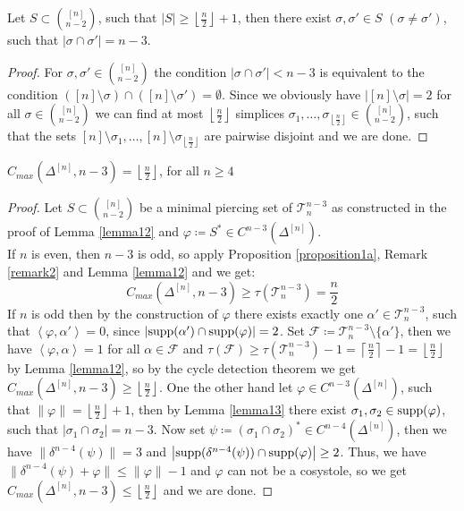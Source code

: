 \begin{lem}\label{lemma13}
Let \(S\subset\binom{[n]}{n-2}\), such that \(\left|S\right|\geq\left\lfloor\frac{n}{2}\right\rfloor+1\), then there exist \(\sigma,\sigma'\in S\) \((\sigma\neq\sigma')\), such that \(\left|\sigma\cap\sigma'\right|=n-3\).
\begin{proof}
For \(\sigma,\sigma'\in\binom{[n]}{n-2}\) the condition \(\left|\sigma\cap\sigma'\right|<n-3\) is equivalent to the condition \(([n]\setminus\sigma)\cap([n]\setminus\sigma')=\emptyset\). Since we obviously have \(\left|[n]\setminus\sigma\right|=2\) for all \(\sigma\in\binom{[n]}{n-2}\) we can find at most \(\left\lfloor\frac{n}{2}\right\rfloor\) simplices \(\sigma_1,\ldots,\sigma_{\left\lfloor\frac{n}{2}\right\rfloor}\in\binom{[n]}{n-2}\), such that the sets \([n]\setminus\sigma_1,\ldots,[n]\setminus\sigma_{\left\lfloor\frac{n}{2}\right\rfloor}\) are pairwise disjoint and we are done.
\end{proof}
\end{lem}

\begin{thm}
\(C_{max}(\Delta^{[n]},n-3)=\left\lfloor\frac{n}{2}\right\rfloor\), for all \(n\geq 4\)
\begin{proof}
Let \(S\subset\binom{[n]}{n-2}\) be a minimal piercing set of \(\mathcal{T}_n^{n-3}\) as constructed in the proof of Lemma \ref{lemma12} and \(\varphi\coloneqq S^*\in C^{n-3}(\Delta^{[n]})\).\\
If \(n\) is even, then \(n-3\) is odd, so apply Proposition \ref{proposition1a}, Remark \ref{remark2} and Lemma \ref{lemma12} and we get:
\[
C_{max}(\Delta^{[n]},n-3)\geq\tau(\mathcal{T}_n^{n-3})=\frac{n}{2}
\]
If \(n\) is odd then by the construction of \(\varphi\) there exists exactly one \(\alpha'\in\mathcal{T}_n^{n-3}\), such that \(\left\langle\varphi,\alpha'\right\rangle=0\), since \(\left|\mathrm{supp}(\alpha')\cap \mathrm{supp}(\varphi)\right|=2\). Set \(\mathcal{F}\coloneqq \mathcal{T}_n^{n-3}\setminus\{\alpha'\}\), then we have \(\left\langle\varphi,\alpha\right\rangle=1\) for all \(\alpha\in\mathcal{F}\) and \(\tau(\mathcal{F})\geq\tau(\mathcal{T}_n^{n-3})-1=\left\lceil\frac{n}{2}\right\rceil-1=\left\lfloor\frac{n}{2}\right\rfloor\) by Lemma \ref{lemma12}, so by the cycle detection theorem we get \(C_{max}(\Delta^{[n]},n-3)\geq\left\lfloor\frac{n}{2}\right\rfloor\). One the other hand let \(\varphi\in C^{n-3}(\Delta^{[n]})\), such that \(\|\varphi\|=\left\lfloor\frac{n}{2}\right\rfloor+1\), then by Lemma \ref{lemma13} there exist \(\sigma_1,\sigma_2\in \mathrm{supp}(\varphi)\), such that \(\left|\sigma_1\cap\sigma_2\right|=n-3\). Now set \(\psi\coloneqq (\sigma_1\cap\sigma_2)^*\in C^{n-4}(\Delta^{[n]})\), then we have \(\|\delta^{n-4}(\psi)\|=3\) and \(\left|\mathrm{supp}(\delta^{n-4}(\psi))\cap \mathrm{supp}(\varphi)\right|\geq 2\). Thus, we have \(\|\delta^{n-4}(\psi)+\varphi\|\leq\|\varphi\|-1\) and \(\varphi\) can not be a cosystole, so we get \(C_{max}(\Delta^{[n]},n-3)\leq\left\lfloor\frac{n}{2}\right\rfloor\) and we are done.
\end{proof}
\end{thm}

